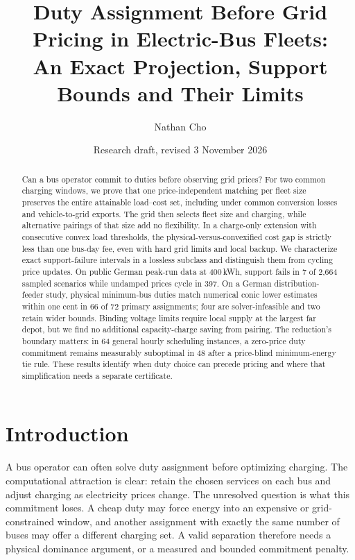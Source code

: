 \documentclass[11pt]{article}
\title{Duty Assignment Before Grid Pricing in Electric-Bus Fleets:\\
An Exact Projection, Support Bounds and Their Limits}
\author{Nathan Cho}
\date{Research draft, revised 3 November 2026}
\theoremstyle{definition}\newtheorem{definition}[theorem]{Definition}
\theoremstyle{remark}\newtheorem{remark}[theorem]{Remark}
\begin{document}
\maketitle

\begin{abstract}
Can a bus operator commit to duties before observing grid prices? For two
common charging windows, we prove that one price-independent matching per
fleet size preserves the entire attainable load--cost set, including under
common conversion losses and vehicle-to-grid exports. The grid then selects
fleet size and charging, while alternative pairings of that size add no
flexibility. In a charge-only extension with consecutive convex load
thresholds, the physical-versus-convexified cost gap is strictly less than
one bus-day fee, even with hard grid limits and local backup. We characterize
exact support-failure intervals in a lossless subclass and distinguish them
from cycling price updates. On public German peak-run data at 400\,kWh,
support fails in 7 of 2,664 sampled scenarios while undamped prices cycle
in 397. On a German distribution-feeder study, physical minimum-bus duties
match numerical conic lower estimates within one cent in 66 of 72 primary
assignments; four are solver-infeasible and two retain wider bounds.
Binding voltage limits require local supply at the largest far depot, but
we find no additional capacity-charge saving from pairing. The reduction's
boundary matters: in 64 general hourly scheduling instances, a zero-price
duty commitment remains measurably suboptimal in 48 after a price-blind
minimum-energy tie rule. These results identify when duty choice can precede
pricing and where that simplification needs a separate certificate.
\end{abstract}

\section{Introduction}\label{sec:intro}

A bus operator can often solve duty assignment before optimizing charging.
The computational attraction is clear: retain the chosen services on each
bus and adjust charging as electricity prices change. The unresolved question
is what this commitment loses. A cheap duty may force energy into an expensive
or grid-constrained window, and another assignment with exactly the same
number of buses may offer a different charging set. A valid separation
therefore needs a physical dominance argument, or a measured and bounded
commitment penalty.
\end{document}
